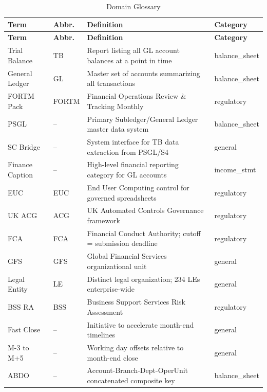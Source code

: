 \documentclass[11pt,a4paper]{article}
\begin{document}
\begin{longtable}{@{}L{3cm}C{1.5cm}L{7cm}L{2.5cm}@{}}
\caption{Domain Glossary} \\
\toprule
\textbf{Term} & \textbf{Abbr.} & \textbf{Definition} & \textbf{Category} \\
\midrule
\endfirsthead
\toprule
\textbf{Term} & \textbf{Abbr.} & \textbf{Definition} & \textbf{Category} \\
\midrule
\endhead
Trial Balance & TB & Report listing all GL account balances at a point in time & balance\_sheet \\
General Ledger & GL & Master set of accounts summarizing all transactions & balance\_sheet \\
FORTM Pack & FORTM & Financial Operations Review \& Tracking Monthly & regulatory \\
PSGL & -- & Primary Subledger/General Ledger master data system & balance\_sheet \\
SC Bridge & -- & System interface for TB data extraction from PSGL/S4 & general \\
Finance Caption & -- & High-level financial reporting category for GL accounts & income\_stmt \\
EUC & EUC & End User Computing control for governed spreadsheets & regulatory \\
UK ACG & ACG & UK Automated Controls Governance framework & regulatory \\
FCA & FCA & Financial Conduct Authority; cutoff = submission deadline & regulatory \\
GFS & GFS & Global Financial Services organizational unit & general \\
Legal Entity & LE & Distinct legal organization; 234 LEs enterprise-wide & general \\
BSS RA & BSS & Business Support Services Risk Assessment & regulatory \\
Fast Close & -- & Initiative to accelerate month-end timelines & general \\
M-3 to M+5 & -- & Working day offsets relative to month-end close & general \\
ABDO & -- & Account-Branch-Dept-OperUnit concatenated composite key & balance\_sheet \\
\bottomrule
\end{longtable}

\end{document}
